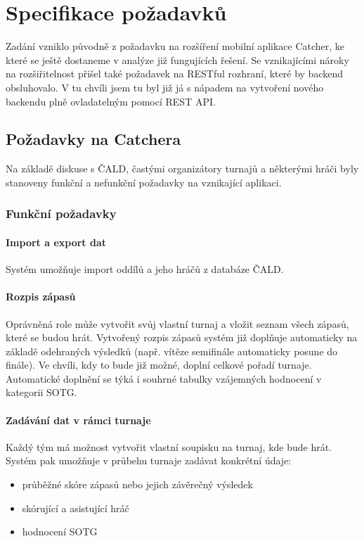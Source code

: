 \chapter{Specifikace požadavků}

Zadání vzniklo původně z požadavku na rozšíření mobilní aplikace Catcher, ke které se ještě
dostaneme v analýze již fungujících řešení. Se vznikajícími nároky na rozšiřitelnost přišel
také požadavek na RESTful rozhraní, které by backend obsluhovalo. V tu chvíli jsem tu byl
již já s nápadem na vytvoření nového backendu plně ovladatelným pomocí REST API.

\section{Požadavky na Catchera}

\indent

Na základě diskuse s ČALD, častými organizátory turnajů a některými hráči byly stanoveny
funkční a nefunkční požadavky na vznikající aplikaci.

\subsection{Funkční požadavky}

\subsubsection*{Import a export dat}
Systém umožňuje import oddílů a jeho hráčů z databáze ČALD.

\subsubsection*{Rozpis zápasů}
Oprávněná role může vytvořit svůj vlastní turnaj a vložit seznam všech zápasů,
které se budou hrát. Vytvořený rozpis zápasů systém již doplňuje automaticky na základě
odehraných výsledků (např. vítěze semifinále automaticky posune do finále). Ve chvíli,
kdy to bude již možné, doplní celkové pořadí turnaje. Automatické doplnění se týká i 
souhrné tabulky vzájemných hodnocení v kategorii SOTG.

\subsubsection*{Zadávání dat v rámci turnaje}
Každý tým má možnost vytvořit vlastní soupisku na turnaj, kde bude hrát. Systém pak umožňuje
v průbehu turnaje zadávat konkrétní údaje:
\begin{itemize}
  \item průběžné skóre zápasů nebo jejich závěrečný výsledek
  \item skórující a asistující hráč
  \item hodnocení SOTG
\end{itemize}

